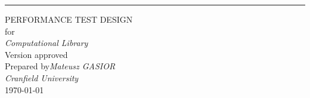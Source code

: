 \begin{flushright}
    \rule{16cm}{5pt}\vskip1cm
    \begin{bfseries}
        \Huge{PERFORMANCE TEST DESIGN}\\
        \vspace{1.9cm}
        for\\
        \vspace{1.9cm}
	    \textit{Computational Library}\\
        \vspace{1.9cm}
        \LARGE{Version \myversion approved}\\
        \vspace{1.9cm}
        Prepared by\textit{Mateusz GASIOR}\\
        \vspace{1.9cm}
        \textit{Cranfield University}\\
        \vspace{1.9cm}
        \today\\
    \end{bfseries}
\end{flushright}